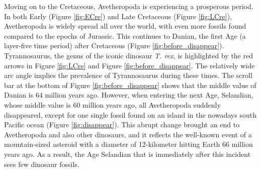 \documentclass[11pt, a4paper,oneside,chapterprefix=false]{scrbook}
\begin{document}
Moving on to the Cretaceous, Avetheropoda is experiencing a prosperous period. In both Early (Figure \ref{fig:ECre}) and Late Cretaceous (Figure \ref{fig:LCre}), Avetheropoda is widely spread all over the world, with even more fossils found compared to the epochs of Jurassic. This continues to Danian, the first Age (a layer-five time period) after Cretaceous (Figure \ref{fig:before_disappear}). Tyrannosaurus, the genus of the iconic dinosaur \emph{T. rex}, is highlighted by the red arrows in Figure \ref{fig:LCre} and Figure \ref{fig:before_disappear}. The relatively wide arc angle implies the prevalence of Tyrannosaurus during these times. The scroll bar at the bottom of Figure \ref{fig:before_disappear} shows that the middle value of Danian is 64 million years ago. However, when entering the next Age, Selandian, whose middle value is 60 million years ago, all Avetheropoda suddenly disappeared, except for one single fossil found on an island in the nowadays south Pacific ocean (Figure \ref{fig:disappear}). This abrupt change brought an end to Avetheropoda and also other dinosaurs, and it reflects the well-known event of a mountain-sized asteroid with a diameter of 12-kilometer hitting Earth 66 million years ago. As a result, the Age Selandian that is immediately after this incident sees few dinosaur fossils. \\
\end{document}

